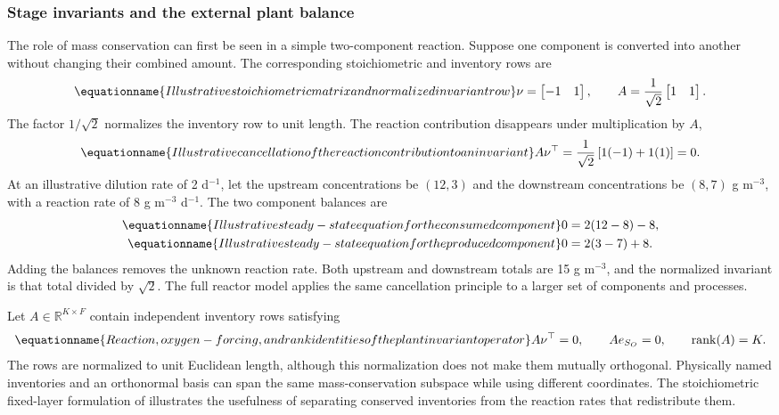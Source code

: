\subsubsection{Stage invariants and the external plant balance}

The role of mass conservation can first be seen in a simple two-component reaction. Suppose one component is converted into another without changing their combined amount. The corresponding stoichiometric and inventory rows are
\begin{equation}
\equationname{Illustrative stoichiometric matrix and normalized invariant row}
\nu=\begin{bmatrix}-1&1\end{bmatrix},\qquad
A=\frac1{\sqrt2}\begin{bmatrix}1&1\end{bmatrix}.
\end{equation}
The factor $1/\sqrt2$ normalizes the inventory row to unit length. The reaction contribution disappears under multiplication by $A$,
\begin{equation}
\equationname{Illustrative cancellation of the reaction contribution to an invariant}
A\nu^\top=\frac1{\sqrt2}\left[1(-1)+1(1)\right]=0.
\end{equation}
At an illustrative dilution rate of 2 d$^{-1}$, let the upstream concentrations be $(12,3)$ and the downstream concentrations be $(8,7)$ g m$^{-3}$, with a reaction rate of 8 g m$^{-3}$ d$^{-1}$. The two component balances are
\begin{align}
\equationname{Illustrative steady-state equation for the consumed component}
0&=2(12-8)-8,\\
\equationname{Illustrative steady-state equation for the produced component}
0&=2(3-7)+8.
\end{align}
Adding the balances removes the unknown reaction rate. Both upstream and downstream totals are 15 g m$^{-3}$, and the normalized invariant is that total divided by $\sqrt2$. The full reactor model applies the same cancellation principle to a larger set of components and processes.

Let $A\in\mathbb R^{K\times F}$ contain independent inventory rows satisfying
\begin{equation}
\equationname{Reaction, oxygen-forcing, and rank identities of the plant invariant operator}
A\nu^\top=0,\qquad Ae_{S_O}=0,\qquad
\operatorname{rank}(A)=K.
\label{eq:plant_invariant_operator}
\end{equation}
The rows are normalized to unit Euclidean length, although this normalization does not make them mutually orthogonal. Physically named inventories and an orthonormal basis can span the same mass-conservation subspace while using different coordinates. The stoichiometric fixed-layer formulation of \citet{SturmWexler2022} illustrates the usefulness of separating conserved inventories from the reaction rates that redistribute them.

